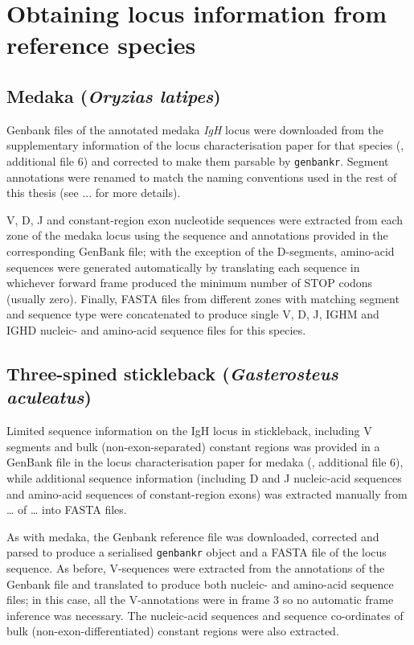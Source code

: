 \section{Obtaining locus information from reference species}
\label{sec:locus_ref}

\subsection{Medaka (\textit{Oryzias latipes})}

Genbank files of the annotated medaka \textit{IgH} locus were downloaded from the supplementary information of the locus characterisation paper for that species (\citep{magadan2011medaka}, additional file 6) and corrected to make them parsable by \texttt{genbankr}. Segment annotations were renamed to match the naming conventions used in the rest of this thesis (see ... for more details). %

V, D, J and constant-region exon nucleotide sequences were extracted from each zone of the medaka locus using the sequence and annotations provided in the corresponding GenBank file; with the exception of the D-segments, amino-acid sequences were generated automatically by translating each sequence in whichever forward frame produced the minimum number of STOP codons (usually zero). %
Finally, FASTA files from different zones with matching segment and sequence type were concatenated to produce single V, D, J, IGHM and IGHD nucleic- and amino-acid sequence files for this species.

\subsection{Three-spined stickleback (\textit{Gasterosteus aculeatus})}

Limited sequence information on the IgH locus in stickleback, including V segments and bulk (non-exon-separated) constant regions was provided in a GenBank file in the locus characterisation paper for medaka (\citep{magadan2011medaka}, additional file 6), while additional sequence information (including D and J nucleic-acid sequences and amino-acid sequences of constant-region exons) was extracted manually from \dots %
of \dots%
into FASTA files. 

As with medaka, the Genbank reference file was downloaded, corrected and parsed to produce a serialised \texttt{genbankr} object and a FASTA file of the locus sequence. As before, V-sequences were extracted from the annotations of the Genbank file and translated to produce both nucleic- and amino-acid sequence files; in this case, all the V-annotations were in frame 3 so no automatic frame inference was necessary. %
The nucleic-acid sequences and sequence co-ordinates of bulk (non-exon-differentiated) constant regions were also extracted. 

